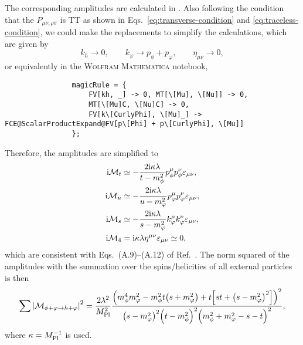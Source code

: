 \documentclass{article}
\begin{document}
            The corresponding amplitudes are calculated in .
            Also following the condition that the $P_{\mu\nu, \rho\sigma}$ is TT as shown in Eqs.~\eqref{eq:transverse-condition} and \eqref{eq:traceless-condition}, we could make the replacements to simplify the calculations, which are given by
            \begin{equation}
                k_h \to 0, \qquad k_\varphi \to p_\phi + p_\varphi, \qquad \eta_{\mu\nu} \to 0,
            \end{equation}
            or equivalently in the \textsc{Wolfram Mathematica} notebook,
            \begin{verbatim}
                magicRule = {
                    FV[kh, _] -> 0, MT[\[Mu], \[Nu]] -> 0, 
                    MT[\[Mu]C, \[Nu]C] -> 0, 
                    FV[k\[CurlyPhi], \[Mu]_] -> FCE@ScalarProductExpand@FV[p\[Phi] + p\[CurlyPhi], \[Mu]]
                };
            \end{verbatim}
            Therefore, the amplitudes are simplified to
            \begin{align}
                \iM[t] & \simeq -\frac{2 \ii \kappa \lambda}{t - m_\phi^2} p_\phi^\mu p_\phi^\nu \varepsilon_{\mu\nu}, \\
                \iM[u] & \simeq -\frac{2 \ii \kappa \lambda}{u - m_\varphi^2} p_\varphi^\mu p_\varphi^\nu \varepsilon_{\mu\nu} , \\
                \iM[s] & \simeq -\frac{2 \ii \kappa \lambda}{s - m_\varphi^2} k_\varphi^\mu k_\varphi^\nu \varepsilon_{\mu\nu}, \\
                \iM[4] & = \ii \kappa \lambda \eta^{\mu\nu} \varepsilon_{\mu\nu} \simeq 0,
            \end{align}
            which are consistent with Eqs.~(A.9)--(A.12) of Ref.~\cite{Xu:2024fjl}.
            The norm squared of the amplitudes with the summation over the spins/helicities of all external particles is then
            \begin{equation}
                \sumMsqr[\phi + \varphi \to h + \varphi] = \frac{2 \lambda^2}{\MPl^2} \frac{\qty(m_\phi^4 m_\varphi^2 - m_\phi^2 t \qty(s + m_\varphi^2) + t \qty[s t + \qty(s - m_\varphi^2)^2])^2}{\qty(s - m_\varphi^2)^2 \qty(t - m_\phi^2)^2 \qty(m_\phi^2 + m_\varphi^2 - s - t)^2},
            \end{equation}
            where $\kappa = M_\mathrm{Pl}^{-1}$ is used.
            
\end{document}
